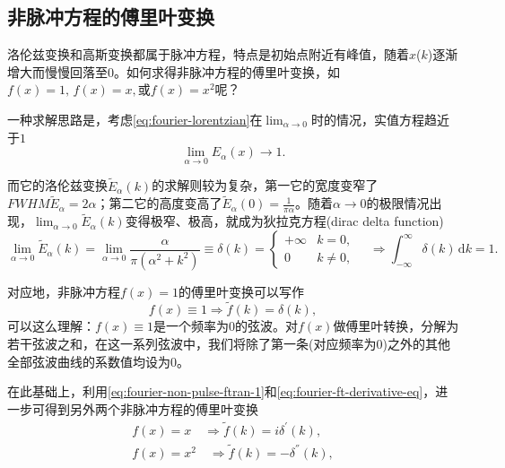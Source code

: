 \subsection{非脉冲方程的傅里叶变换}
\label{sec:fourier-non-pulse-functions}
洛伦兹变换和高斯变换都属于脉冲方程，特点是初始点附近有峰值，随着$x$($k$)逐渐增大而慢慢回落至$0$。如何求得非脉冲方程的傅里叶变换，如$f(x) = 1, \, f(x)=x, $或$f(x) = x^{2}$呢？

一种求解思路是，考虑\eqref{eq:fourier-lorentzian}在$\lim_{\alpha \rightarrow 0}$时的情况，实值方程趋近于$1$
\begin{equation*}
  \lim_{\alpha \rightarrow 0} E_{\alpha}(x) \rightarrow 1.
\end{equation*}

而它的洛伦兹变换$\widetilde{E}_{\alpha}(k)$的求解则较为复杂，第一它的宽度变窄了$FWHM \widetilde{E}_{\alpha} = 2 \alpha$；第二它的高度变高了$\widetilde{E}_{\alpha} \left( 0 \right) = \frac{1}{\pi \alpha}$。随着$\alpha \rightarrow 0$的极限情况出现，$\lim_{\alpha \rightarrow 0} \widetilde{E}_{\alpha}(k)$变得极窄、极高，就成为狄拉克方程(dirac delta function) 
\begin{equation}
  \label{eq:fourier-non-pulse-dirac}
  \lim_{\alpha \rightarrow 0} \widetilde{E}_{\alpha}(k) = \lim_{\alpha \rightarrow 0} \frac{
  \alpha
  }{\pi \left( \alpha^{2} + k^{2} \right)}
  \equiv \delta (k) = \begin{cases}
  + \infty & k = 0, \\
  0 & k \neq 0,
\end{cases} \quad \Rightarrow \int_{- \infty}^{\infty} \delta (k) \, \mathrm{d} k = 1.
\end{equation}

对应地，非脉冲方程$f(x) =1$的傅里叶变换可以写作
\begin{equation}
  \label{eq:fourier-non-pulse-ftran-1}
  f(x) \equiv 1 \Rightarrow \tilde{f}(k) = \delta(k),
\end{equation}
可以这么理解：$f(x) \equiv 1$是一个频率为$0$的弦波。对$f(x)$做傅里叶转换，分解为若干弦波之和，在这一系列弦波中，我们将除了第一条(对应频率为$0$)之外的其他全部弦波曲线的系数值均设为$0$。

在此基础上，利用\eqref{eq:fourier-non-pulse-ftran-1}和\eqref{eq:fourier-ft-derivative-eq}，进一步可得到另外两个非脉冲方程的傅里叶变换
\begin{align}
  \label{eq:fourier-non-pulse-ftran-x1}
  f(x) = x \quad \Rightarrow \tilde{f}(k) = i \delta^{'}(k), \\
  \label{eq:fourier-non-pulse-ftran-x2}
  f(x) = x^{2} \quad \Rightarrow \tilde{f}(k) = - \delta^{''}(k),
\end{align}

